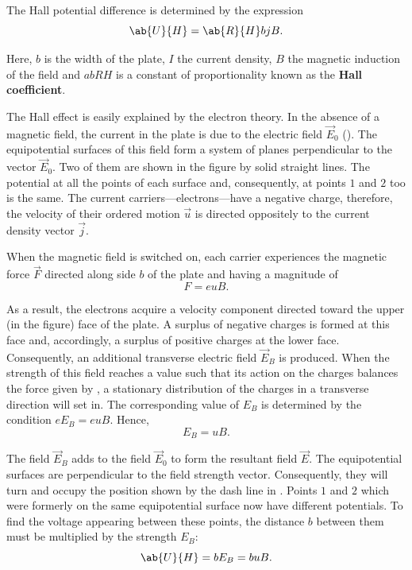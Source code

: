 The Hall potential difference is determined by the expression
\begin{equation}\label{eq:11_13}
    \ab{U}{H} = \ab{R}{H} b j B.
\end{equation}

\noindent
Here, $b$ is the width of the plate, $I$ the current density, $B$ the magnetic induction of the field and $ab{R}{H}$ is a constant of proportionality known as the \textbf{Hall coefficient}.

The Hall effect is easily explained by the electron theory.
In the absence of a magnetic field, the current in the plate is due to the electric field $\vec{E}_0$ ().
The equipotential surfaces of this field form a system of planes perpendicular to the vector $\vec{E}_0$.
Two of them are shown in the figure by solid straight lines.
The potential at all the points of each surface and, consequently, at points $1$ and $2$ too is the same.
The current carriers---electrons---have a negative charge, therefore, the velocity of their ordered motion $\vec{u}$ is directed oppositely to the current density vector $\vec{j}$.

When the magnetic field is switched on, each carrier experiences the magnetic force $\vec{F}$ directed along side $b$ of the plate and having a magnitude of
\begin{equation}\label{eq:11_14}
    F = euB.
\end{equation}

\noindent
As a result, the electrons acquire a velocity component directed toward the upper (in the figure) face of the plate.
A surplus of negative charges is formed at this face and, accordingly, a surplus of positive charges at the lower face.
Consequently, an additional transverse electric field $\vec{E}_B$ is produced.
When the strength of this field reaches a value such that its action on the charges balances the force given by , a stationary distribution of the charges in a transverse direction will set in.
The corresponding value of $E_B$ is determined by the condition $eE_B = euB$.
Hence,
\begin{equation*}
    E_B = uB.
\end{equation*}

The field $\vec{E}_B$ adds to the field $\vec{E}_0$ to form the resultant field $\vec{E}$.
The equipotential surfaces are perpendicular to the field strength vector.
Consequently, they will turn and occupy the position shown by the dash line in .
Points $1$ and $2$ which were formerly on the same equipotential surface now have different potentials.
To find the voltage appearing between these points, the distance $b$ between them must be multiplied by the strength $E_B$:
\begin{equation*}
    \ab{U}{H} = b E_B = b u B.
\end{equation*}

